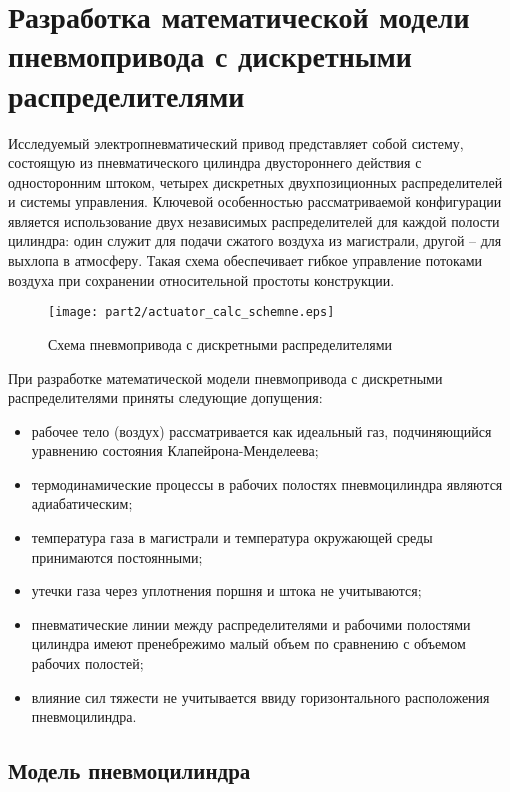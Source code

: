 \section{Разработка математической модели пневмопривода с дискретными распределителями}

Исследуемый электропневматический привод представляет собой систему,
состоящую из пневматического цилиндра двустороннего действия с односторонним штоком, четырех
дискретных двухпозиционных распределителей и системы управления. Ключевой особенностью рассматриваемой
конфигурации является использование двух независимых распределителей для каждой полости цилиндра:
один служит для подачи сжатого воздуха из магистрали, другой -- для выхлопа в атмосферу. Такая схема обеспечивает
гибкое управление потоками воздуха при сохранении относительной простоты конструкции.

\begin{figure}[h]
	\centering
	\texttt{[image: part2/actuator\_calc\_schemne.eps]}
	\caption{Схема пневмопривода с дискретными распределителями}
	\label{fig:pneumatic_actuator}
\end{figure}

При разработке математической модели пневмопривода с дискретными распределителями приняты следующие допущения:

\begin{itemize}
	\item рабочее тело (воздух) рассматривается как идеальный газ, подчиняющийся уравнению состояния Клапейрона-Менделеева;
	\item термодинамические процессы в рабочих полостях пневмоцилиндра являются адиабатическим;
	\item температура газа в магистрали и температура окружающей среды принимаются постоянными;
	\item утечки газа через уплотнения поршня и штока не учитываются;
	\item пневматические линии между распределителями и рабочими полостями цилиндра имеют пренебрежимо малый объем по сравнению с объемом рабочих полостей;
	\item влияние сил тяжести не учитывается ввиду горизонтального расположения пневмоцилиндра.

\end{itemize}

\subsection*{Модель пневмоцилиндра}

